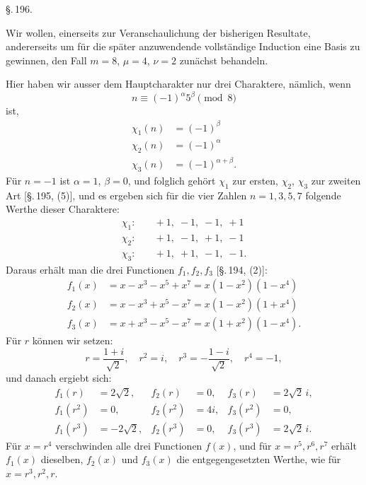 
\begin{center}
\S.\,196.

\end{center}

Wir wollen, einerseits zur Veranschaulichung der bisherigen Resultate, andererseits um für die später anzuwendende vollständige Induction eine Basis zu gewinnen, den Fall $m = 8$, $\mu = 4$, $\nu = 2$ zunächst behandeln.

Hier haben wir ausser dem Hauptcharakter nur drei Charaktere, nämlich, wenn
\[
n \equiv (-1)^\alpha 5^\beta \pmod{8}
\]
ist,
\[
\begin{aligned}
\chi_1(n) & = (-1)^\beta \\
\chi_2(n) & = (-1)^\alpha \\
\chi_3(n) & = (-1)^{\alpha+\beta}.
\end{aligned}
\]
Für $n = -1$ ist $\alpha = 1$, $\beta = 0$, und folglich gehört $\chi_1$ zur ersten, $\chi_2$, $\chi_3$ zur zweiten Art [\S.\,195, (5)], und es ergeben sich für die vier Zahlen $n = 1, 3, 5, 7$ folgende Werthe dieser Charaktere:
\[
\begin{aligned}
\chi_1: & \quad +1, \; -1, \; -1, \; +1 \\
\chi_2: & \quad +1, \; -1, \; +1, \; -1 \\
\chi_3: & \quad +1, \; +1, \; -1, \; -1.
\end{aligned}
\]
Daraus erhält man die drei Functionen $f_1, f_2, f_3$ [\S.\,194, (2)]:
\[
\begin{aligned}
f_1(x) & = x - x^3 - x^5 + x^7 = x(1-x^2)(1-x^4) \\
f_2(x) & = x - x^3 + x^5 - x^7 = x(1-x^2)(1+x^4) \\
f_3(x) & = x + x^3 - x^5 - x^7 = x(1+x^2)(1-x^4).
\end{aligned}
\]
Für $r$ können wir setzen:
\[
r = \frac{1+i}{\sqrt{2}}, \quad r^2 = i, \quad r^3 = -\frac{1-i}{\sqrt{2}}, \quad r^4 = -1,
\]
und danach ergiebt sich:
\[
\begin{aligned}
f_1(r) & = 2\sqrt{2}, & f_2(r) & = 0, & f_3(r) & = 2\sqrt{2}\,i, \\
f_1(r^2) & = 0, & f_2(r^2) & = 4i, & f_3(r^2) & = 0, \\
f_1(r^3) & = -2\sqrt{2}, & f_2(r^3) & = 0, & f_3(r^3) & = 2\sqrt{2}\,i.
\end{aligned}
\]
Für $x = r^4$ verschwinden alle drei Functionen $f(x)$, und für $x = r^5, r^6, r^7$ erhält $f_1(x)$ dieselben, $f_2(x)$ und $f_3(x)$ die entgegengesetzten Werthe, wie für $x = r^3, r^2, r$.
